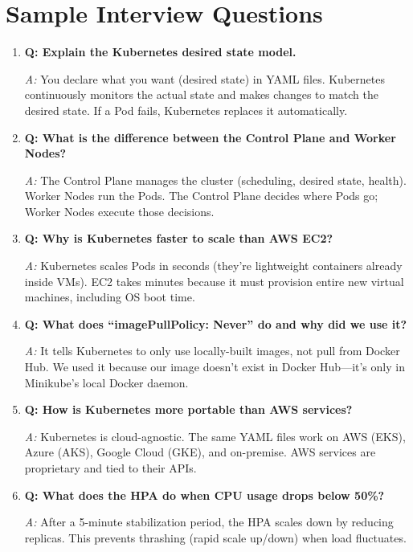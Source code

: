 \documentclass[12pt,a4paper]{article}
\begin{document}
\section{Sample Interview Questions}

\begin{enumerate}
    \item \textbf{Q: Explain the Kubernetes desired state model.}

    \textit{A:} You declare what you want (desired state) in YAML files. Kubernetes continuously monitors the actual state and makes changes to match the desired state. If a Pod fails, Kubernetes replaces it automatically.

    \item \textbf{Q: What is the difference between the Control Plane and Worker Nodes?}

    \textit{A:} The Control Plane manages the cluster (scheduling, desired state, health). Worker Nodes run the Pods. The Control Plane decides where Pods go; Worker Nodes execute those decisions.

    \item \textbf{Q: Why is Kubernetes faster to scale than AWS EC2?}

    \textit{A:} Kubernetes scales Pods in seconds (they're lightweight containers already inside VMs). EC2 takes minutes because it must provision entire new virtual machines, including OS boot time.

    \item \textbf{Q: What does ``imagePullPolicy: Never'' do and why did we use it?}

    \textit{A:} It tells Kubernetes to only use locally-built images, not pull from Docker Hub. We used it because our image doesn't exist in Docker Hub—it's only in Minikube's local Docker daemon.

    \item \textbf{Q: How is Kubernetes more portable than AWS services?}

    \textit{A:} Kubernetes is cloud-agnostic. The same YAML files work on AWS (EKS), Azure (AKS), Google Cloud (GKE), and on-premise. AWS services are proprietary and tied to their APIs.

    \item \textbf{Q: What does the HPA do when CPU usage drops below 50\%?}

    \textit{A:} After a 5-minute stabilization period, the HPA scales down by reducing replicas. This prevents thrashing (rapid scale up/down) when load fluctuates.
\end{enumerate}
\end{document}
